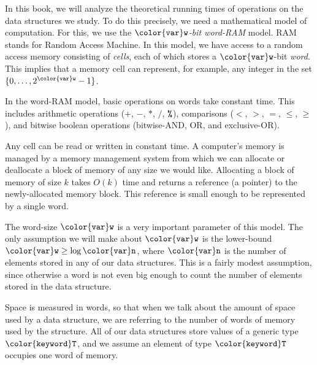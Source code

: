\documentclass[10pt]{book}
\theoremstyle{plain}
\theoremstyle{definition}
\begin{document}
In this book, we will analyze the theoretical running times of operations
on the data structures we study.  To do this precisely, we need a
mathematical model of computation.  For this, we use the \emph{\ensuremath{\mathtt{{\color{var}w}}}-bit
word-RAM}
%
%
model.  RAM stands for Random Access Machine. In this model, we
have access to a random access memory consisting of \emph{cells}, each of
which stores a \ensuremath{\mathtt{{\color{var}w}}}-bit \emph{word}.
%
This implies that a memory cell can
represent, for example, any integer in the set $\{0,\ldots,2^{\ensuremath{\mathtt{{\color{var}w}}}}-1\}$.

In the word-RAM model, basic operations on words take constant time.
This includes arithmetic operations (\ensuremath{\mathtt{+}}, \ensuremath{\mathtt{-}}, \ensuremath{\mathtt{*}}, \ensuremath{\mathtt{/}}, \ensuremath{\mathtt{\text{\ttfamily \%}}}), comparisons
($<$, $>$, $=$, $\le$, $\ge$), and bitwise boolean operations (bitwise-AND,
OR, and exclusive-OR).

Any cell can be read or written in constant time.  A computer's memory
is managed by a memory management system from which we can allocate or
deallocate a block of memory of any size we would like. Allocating a
block of memory of size $k$ takes $O(k)$ time and returns a reference
(a pointer) to the newly-allocated memory block.  This reference is
small enough to be represented by a single word.

The word-size \ensuremath{\mathtt{{\color{var}w}}} is a very important parameter of this model.  The only
assumption we will make about \ensuremath{\mathtt{{\color{var}w}}} is the lower-bound $\ensuremath{\mathtt{{\color{var}w}}} \ge \log \ensuremath{\mathtt{{\color{var}n}}}$,
where \ensuremath{\mathtt{{\color{var}n}}} is the number of elements stored in any of our data structures.
This is a fairly modest assumption, since otherwise a word is not even
big enough to count the number of elements stored in the data structure.

Space is measured in words, so that when we talk about the amount of
space used by a data structure, we are referring to the number of words
of memory used by the structure.  All of our data structures store values of
a generic type \ensuremath{\mathtt{{\color{keyword}T}}}, and we assume an element of type \ensuremath{\mathtt{{\color{keyword}T}}} occupies one word
of memory.  
\end{document}
